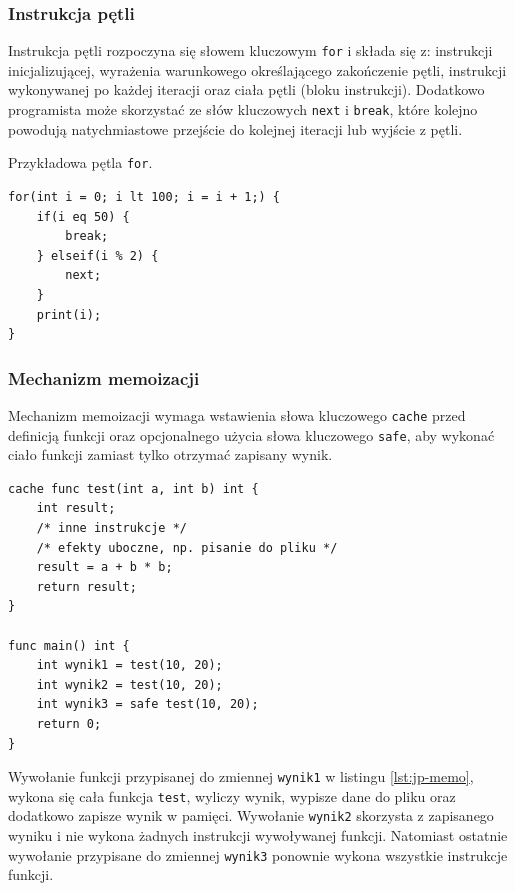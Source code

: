 \subsubsection{Instrukcja pętli}

Instrukcja pętli rozpoczyna się słowem kluczowym \verb|for| i składa się z: instrukcji inicjalizującej, wyrażenia warunkowego określającego zakończenie pętli, instrukcji wykonywanej po każdej iteracji oraz ciała pętli (bloku instrukcji). Dodatkowo programista może skorzystać ze słów kluczowych \verb|next| i \verb|break|, które kolejno powodują natychmiastowe przejście do kolejnej iteracji lub wyjście z pętli.

Przykładowa pętla \verb|for|.
\begin{lstlisting}[caption={Instrukcja pętli}, label={lst:jp-for}, morekeywords={next, eq, lt, elseif}]
for(int i = 0; i lt 100; i = i + 1;) {
    if(i eq 50) {
        break;
    } elseif(i % 2) {
        next;
    }
    print(i);
}
\end{lstlisting}

\subsubsection{Mechanizm memoizacji}

Mechanizm memoizacji wymaga wstawienia słowa kluczowego \verb|cache| przed definicją funkcji oraz opcjonalnego użycia słowa kluczowego \verb|safe|, aby wykonać ciało funkcji zamiast tylko otrzymać zapisany wynik.

\newpage
\begin{lstlisting}[caption={Mechanizm memoizacji}, morekeywords={cache, func, safe}, label={lst:jp-memo}]
cache func test(int a, int b) int {
    int result;
    /* inne instrukcje */
    /* efekty uboczne, np. pisanie do pliku */
    result = a + b * b;
    return result;
}

func main() int {
    int wynik1 = test(10, 20);
    int wynik2 = test(10, 20);
    int wynik3 = safe test(10, 20);
    return 0;
}
\end{lstlisting}

Wywołanie funkcji przypisanej do zmiennej \verb|wynik1| w listingu \ref{lst:jp-memo}, wykona się cała funkcja \verb|test|, wyliczy wynik, wypisze dane do pliku oraz dodatkowo zapisze wynik w pamięci. Wywołanie \verb|wynik2| skorzysta z zapisanego wyniku i nie wykona żadnych instrukcji wywoływanej funkcji. Natomiast ostatnie wywołanie przypisane do zmiennej \verb|wynik3| ponownie wykona wszystkie instrukcje funkcji.

